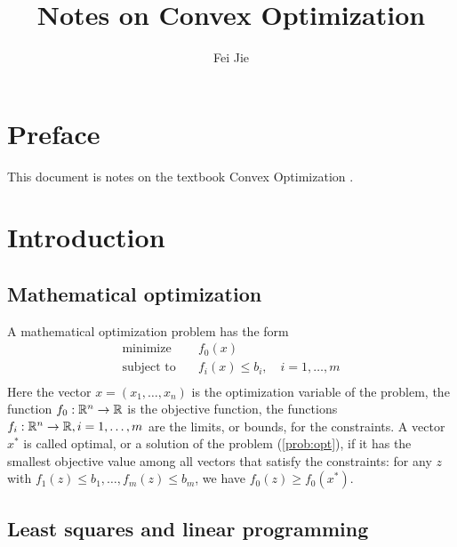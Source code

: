 \documentclass[11pt,oneside,a4paper]{book}
\title{Notes on Convex Optimization}
\author{Fei Jie}
\date{}
\theoremstyle{definition}
\DeclareRobustCommand{\[}{\begin{equation}}
\DeclareRobustCommand{\]}{\end{equation}}
\begin{document}
\setlength{\parskip}{0.25 \baselineskip}
\newlength{\figwidth}
\setlength{\figwidth}{26pc}
\newlength{\notationgap}
\setlength{\notationgap}{1pc}

\frontmatter


\maketitle
\tableofcontents
{}

\chapter{Preface}

This document is notes on the textbook Convex Optimization \cite{boyd2004convex}.

\mainmatter

\chapter{Introduction}

\section{Mathematical optimization}

A mathematical optimization problem has the form
\begin{equation}\label{prob:opt}
	\begin{split}
		\text{minimize}\quad   & f_0(x) \\
		\text{subject to}\quad & f_i(x)\leq b_i,\quad i=1,\dots ,m \\
	\end{split}
\end{equation}
Here the vector $x=(x_1,\dots,x_n)$ is the optimization variable of the problem, the function $ f_0:\mathbb{R}^n\to\mathbb{R} $ is the objective function, the functions $ f_i:\mathbb{R}^n\to\mathbb{R}, i=1,\dots,m $ are the limits, or bounds, for the constraints. A vector $ x^* $ is called optimal, or a solution of the problem (\ref{prob:opt}), if it has the smallest objective value among all vectors that satisfy the constraints: for any $ z $ with $ f_1(z)\leq b_1,\dots,f_m(z)\leq b_m $, we have $ f_0(z)\geq f_0(x^*) $.


\section{Least squares and linear programming}
\end{document}
